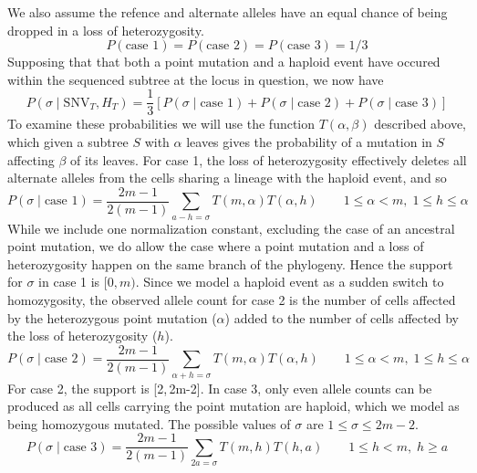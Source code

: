 \documentclass[../../main.tex]{subfiles}
\begin{document}
We also assume the refence and alternate alleles have an equal chance of being dropped in a loss of heterozygosity.
\begin{equation*}
P(\text{case 1})=P(\text{case 2}) = P(\text{case 3}) = 1/3
\end{equation*}
Supposing that that both a point mutation and a haploid event have occured within the sequenced subtree at the locus in question, we now have
\begin{equation*}
P(\sigma\mid\text{SNV}_T,H_T)=\frac{1}{3}\left[P(\sigma\mid\text{case 1})+P(\sigma\mid\text{case 2})+P(\sigma\mid\text{case 3})\right]
\end{equation*}
To examine these probabilities we will use the function $T(\alpha,\beta)$ described above, which given a subtree $S$ with $\alpha$ leaves gives the probability of a mutation in $S$ affecting $\beta$ of its leaves.
For case 1, the loss of heterozygosity effectively deletes all alternate alleles from the cells sharing a lineage with the haploid event, and so
\begin{equation*}
P(\sigma\mid\text{case 1}) = \frac{2m-1}{2(m-1)}\sum_{a-h=\sigma}T(m,\alpha)T(\alpha,h)\qquad 1\leq \alpha < m,\;1\leq h\leq\alpha 
\end{equation*}
While we include one normalization constant, excluding the case of an ancestral point mutation, we do allow the case where a point mutation and a loss of heterozygosity happen on the same branch of the phylogeny.
Hence the support for $\sigma$ in case 1 is $[0,m)$.
Since we model a haploid event as a sudden switch to homozygosity, the observed allele count for case 2 is the number of cells affected by the heterozygous point mutation ($\alpha$) added to the number of cells affected by the loss of heterozygosity ($h$).
\begin{equation*}
P(\sigma\mid\text{case 2}) = \frac{2m-1}{2(m-1)}\sum_{\alpha+h=\sigma}T(m,\alpha)T(\alpha,h) \qquad 1\leq \alpha < m,\;1\leq h\leq\alpha 
\end{equation*}
For case 2, the support is [2,\,2m-2].
In case 3, only even allele counts can be produced as all cells carrying the point mutation are haploid, which we model as being homozygous mutated.
The possible values of $\sigma$ are $1\leq\sigma\leq 2m-2$.
\begin{equation*}
P(\sigma\mid\text{case 3}) = \frac{2m-1}{2(m-1)}\sum_{2a=\sigma} T(m,h)T(h,a) \qquad 1\leq h < m,\; h\geq a
\end{equation*}
\end{document}
